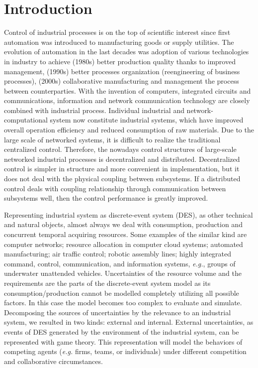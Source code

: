\documentclass[runningheads]{llncs}
\begin{document}
\section*{Introduction}
\label{sec:intro}

Control of industrial processes is on the top of scientific interest since first automation was introduced to manufacturing goods or supply utilities. The evolution of automation in the last decades was adoption of various technologies in industry to achieve (1980s) better production quality thanks to improved management, (1990s) better processes organization (reengineering of business processes), (2000s) collaborative manufacturing and management the process between counterparties. With the invention of computers, integrated circuits and communications, information and network communication technology are closely combined with industrial process. Individual industrial and network-computational system now constitute industrial systems, which have improved overall operation efficiency and reduced consumption of raw materials. Due to the large scale of networked systems, it is difficult to realize the traditional centralized control. Therefore, the nowadays control structures of large-scale networked industrial processes is decentralized and distributed. Decentralized control is simpler in structure and more convenient in implementation, but it does not deal with the physical coupling between subsystems. If a distributed control deals with coupling relationship through communication between subsystems well, then the control performance is greatly improved.


Representing industrial system as discrete-event system (DES), as other technical and natural objects, almost always we deal with consumption, production and concurrent temporal acquiring resources. Some examples of the similar kind are computer networks; resource allocation in computer cloud systems; automated manufacturing; air traffic control; robotic assembly lines; highly integrated command, control, communication, and information systems, \emph{e.g.}, groups of underwater unattended vehicles.  Uncertainties of the resource volume and the requirements are the parts of the discrete-event system model as its consumption/production cannot be modelled completely utilizing all possible factors. In this case the model becomes too complex to evaluate and simulate. Decomposing the sources of uncertainties by the relevance to an industrial system, we resulted in two kinds: external and internal.  External uncertainties, as events of DES generated by the environment of the industrial system, can be represented with game theory.  This representation will model the behaviors of competing agents (\emph{e.g.} firms, teams, or individuals) under different competition and collaborative circumstances.
\end{document}
